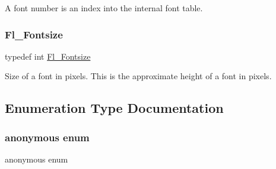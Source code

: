 A font number is an index into the internal font table. \mbox{\label{_enumerations_8_h_ad58927f5c691454480f7cd28362502f1}} 
\subsubsection{\texorpdfstring{Fl\+\_\+\+Fontsize}{Fl\_Fontsize}}
{\footnotesize\ttfamily typedef int \hyperlink{_enumerations_8_h_ad58927f5c691454480f7cd28362502f1}{Fl\+\_\+\+Fontsize}}

Size of a font in pixels. This is the approximate height of a font in pixels. 

\subsection{Enumeration Type Documentation}
\mbox{\label{_enumerations_8_h_a06fc87d81c62e9abb8790b6e5713c55b}} 
\subsubsection{\texorpdfstring{anonymous enum}{anonymous enum}}
{\footnotesize\ttfamily anonymous enum}

